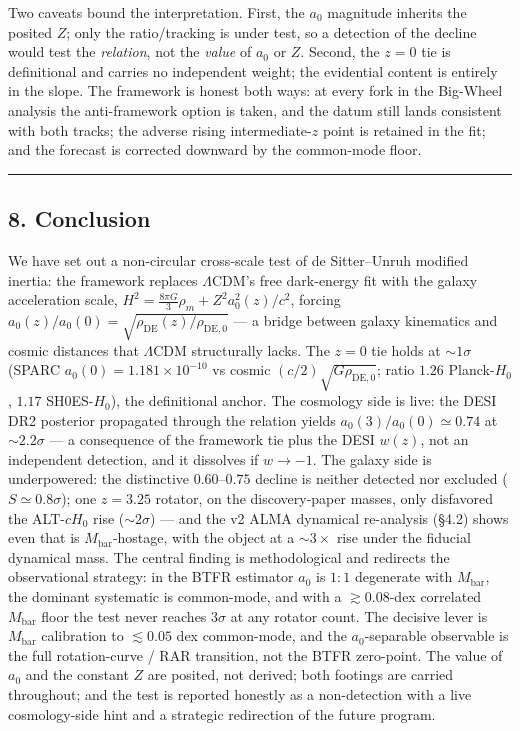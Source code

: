 \documentclass[
]{article}
\begin{document}
Two caveats bound the interpretation. First, the \(a_0\) magnitude
inherits the posited \(Z\); only the ratio/tracking is under test, so a
detection of the decline would test the \emph{relation}, not the
\emph{value} of \(a_0\) or \(Z\). Second, the \(z=0\) tie is
definitional and carries no independent weight; the evidential content
is entirely in the slope. The framework is honest both ways: at every
fork in the Big-Wheel analysis the anti-framework option is taken, and
the datum still lands consistent with both tracks; the adverse rising
intermediate-\(z\) point is retained in the fit; and the forecast is
corrected downward by the common-mode floor.

\begin{center}\rule{0.5\linewidth}{0.5pt}\end{center}

\subsection{8. Conclusion}\label{conclusion}

We have set out a non-circular cross-scale test of de Sitter--Unruh
modified inertia: the framework replaces \(\Lambda\)CDM's free
dark-energy fit with the galaxy acceleration scale,
\(H^2=\tfrac{8\pi G}{3}\rho_m+Z^2a_0^2(z)/c^2\), forcing
\(a_0(z)/a_0(0)=\sqrt{\rho_\mathrm{DE}(z)/\rho_\mathrm{DE,0}}\) --- a bridge
between galaxy kinematics and cosmic distances that \(\Lambda\)CDM
structurally lacks. The \(z=0\) tie holds at \(\sim1\sigma\) (SPARC
\(a_0(0)=1.181\times10^{-10}\) vs cosmic
\((c/2)\sqrt{G\rho_\mathrm{DE,0}}\); ratio \(1.26\) Planck-\(H_0\),
\(1.17\) SH0ES-\(H_0\)), the definitional anchor. The cosmology side is
live: the DESI DR2 posterior propagated through the relation yields
\(a_0(3)/a_0(0)\simeq0.74\) at \(\sim2.2\sigma\) --- a consequence of
the framework tie plus the DESI \(w(z)\), not an independent detection,
and it dissolves if \(w\to-1\). The galaxy side is underpowered: the
distinctive \(0.60\)--\(0.75\) decline is neither detected nor excluded
(\(S\simeq0.8\sigma\)); one \(z=3.25\) rotator, on the discovery-paper
masses, only disfavored the ALT-\(cH_0\) rise (\(\sim2\sigma\)) --- and
the v2 ALMA dynamical re-analysis (§4.2) shows even that is
\(M_\mathrm{bar}\)-hostage, with the object at a \(\sim3\times\) rise under
the fiducial dynamical mass. The central finding is methodological and
redirects the observational strategy: in the BTFR estimator \(a_0\) is
\(1{:}1\) degenerate with \(M_\mathrm{bar}\), the dominant systematic is
common-mode, and with a \(\gtrsim0.08\)-dex correlated \(M_\mathrm{bar}\)
floor the test never reaches \(3\sigma\) at any rotator count. The
decisive lever is \(M_\mathrm{bar}\) calibration to \(\lesssim0.05\) dex
common-mode, and the \(a_0\)-separable observable is the full
rotation-curve / RAR transition, not the BTFR zero-point. The value of
\(a_0\) and the constant \(Z\) are posited, not derived; both footings
are carried throughout; and the test is reported honestly as a
non-detection with a live cosmology-side hint and a strategic
redirection of the future program.
\end{document}
